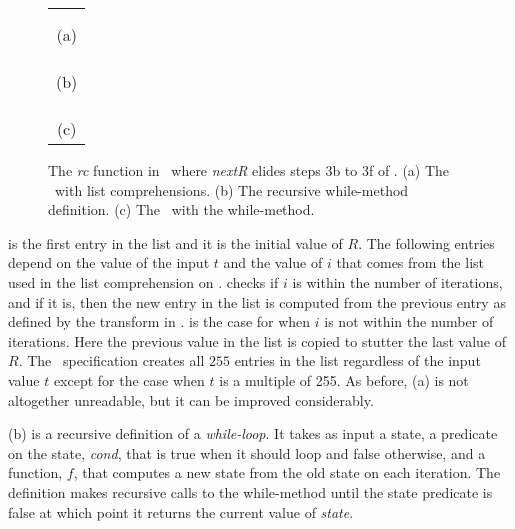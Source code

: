\begin{figure}[t]
  \begin{center}
    \begin{tabular}{l}
      \usebox{\RcCry} \\ \\
      \multicolumn{1}{c}{(a)} \\ \\
      \usebox{\whilemethod} \\ \\
      \multicolumn{1}{c}{(b)} \\ \\ 
      \usebox{\RcCryLib} \\ \\
      \multicolumn{1}{c}{(c)}
    \end{tabular}
  \end{center}
  \caption{The \emph{rc} function in \cryptol\ where \emph{nextR} elides steps 3b to 3f of . (a) The \cryptol\ with list comprehensions. (b) The recursive while-method definition. (c) The \cryptol\ with the while-method.}
  \label{fig:rccry}
\end{figure}

 is the first entry in the list and it is the initial value of $R$.
The following entries depend on the value of the input $t$ and the value of $i$ that comes from the list used in the list comprehension on .
 checks if $i$ is within the number of iterations, and if it is, then the new entry in the list is computed from the previous entry as defined by the transform in .
 is the case for when $i$ is not within the number of iterations.
Here the previous value in the list is copied to stutter the last value of $R$. 
The \cryptol\ specification creates all $255$ entries in the list regardless of the input value $t$ except for the case when $t$ is a multiple of 255.
As before, (a) is not altogether unreadable, but it can be improved considerably.

(b) is a recursive definition of a \emph{while-loop}.
It takes as input a state, a predicate on the state, \emph{cond}, that is true when it should loop and false otherwise, and a function, $f$, that computes a new state from the old state on each iteration.
The definition makes recursive calls to the while-method until the state predicate is false at which point it returns the current value of \emph{state}.

